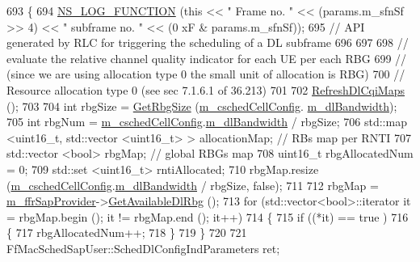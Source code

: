 \begin{DoxyCode}
693 \{
694   \hyperlink{log-macros-disabled_8h_a90b90d5bad1f39cb1b64923ea94c0761}{NS\_LOG\_FUNCTION} (\textcolor{keyword}{this} << \textcolor{stringliteral}{" Frame no. "} << (params.m\_sfnSf >> 4) << \textcolor{stringliteral}{" subframe no. "} << (0
      xF & params.m\_sfnSf));
695   \textcolor{comment}{// API generated by RLC for triggering the scheduling of a DL subframe}
696 
697 
698   \textcolor{comment}{// evaluate the relative channel quality indicator for each UE per each RBG}
699   \textcolor{comment}{// (since we are using allocation type 0 the small unit of allocation is RBG)}
700   \textcolor{comment}{// Resource allocation type 0 (see sec 7.1.6.1 of 36.213)}
701 
702   \hyperlink{classns3_1_1FdTbfqFfMacScheduler_a45264dfea612218caa30fa414ea7989c}{RefreshDlCqiMaps} ();
703 
704   \textcolor{keywordtype}{int} rbgSize = \hyperlink{classns3_1_1FdTbfqFfMacScheduler_aee50f9f1c073802906068329c43811f1}{GetRbgSize} (\hyperlink{classns3_1_1FdTbfqFfMacScheduler_a73d5d866713fa06e1cc6186b0f556693}{m\_cschedCellConfig}.
      \hyperlink{structns3_1_1FfMacCschedSapProvider_1_1CschedCellConfigReqParameters_ad18c695bd3c9d7f742ba1dab4a941e8a}{m\_dlBandwidth});
705   \textcolor{keywordtype}{int} rbgNum = \hyperlink{classns3_1_1FdTbfqFfMacScheduler_a73d5d866713fa06e1cc6186b0f556693}{m\_cschedCellConfig}.\hyperlink{structns3_1_1FfMacCschedSapProvider_1_1CschedCellConfigReqParameters_ad18c695bd3c9d7f742ba1dab4a941e8a}{m\_dlBandwidth} / rbgSize;
706   std::map <uint16\_t, std::vector <uint16\_t> > allocationMap; \textcolor{comment}{// RBs map per RNTI}
707   std::vector <bool> rbgMap;  \textcolor{comment}{// global RBGs map}
708   uint16\_t rbgAllocatedNum = 0;
709   std::set <uint16\_t> rntiAllocated;
710   rbgMap.resize (\hyperlink{classns3_1_1FdTbfqFfMacScheduler_a73d5d866713fa06e1cc6186b0f556693}{m\_cschedCellConfig}.\hyperlink{structns3_1_1FfMacCschedSapProvider_1_1CschedCellConfigReqParameters_ad18c695bd3c9d7f742ba1dab4a941e8a}{m\_dlBandwidth} / rbgSize, \textcolor{keyword}{false});
711 
712   rbgMap = \hyperlink{classns3_1_1FdTbfqFfMacScheduler_a15bcdfbb46c65cae0d42e26b321f7827}{m\_ffrSapProvider}->\hyperlink{classns3_1_1LteFfrSapProvider_ad60306dae43b74dc25b65f81d6587a24}{GetAvailableDlRbg} ();
713   \textcolor{keywordflow}{for} (std::vector<bool>::iterator it = rbgMap.begin (); it != rbgMap.end (); it++)
714     \{
715       \textcolor{keywordflow}{if} ((*it) == true )
716         \{
717           rbgAllocatedNum++;
718         \}
719     \}
720 
721   FfMacSchedSapUser::SchedDlConfigIndParameters ret;

\end{DoxyCode}
